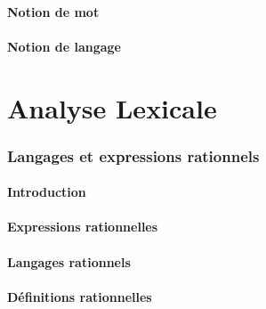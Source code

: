 \subsection{Notion de mot}






 
\subsection{Notion de langage}



 
 
\part{Analyse Lexicale}
 
 
\section{Langages et expressions rationnels}
 
\subsection{Introduction}



 
\subsection{Expressions rationnelles}



 
\subsection{Langages rationnels}




 
\subsection{Définitions rationnelles}


 
